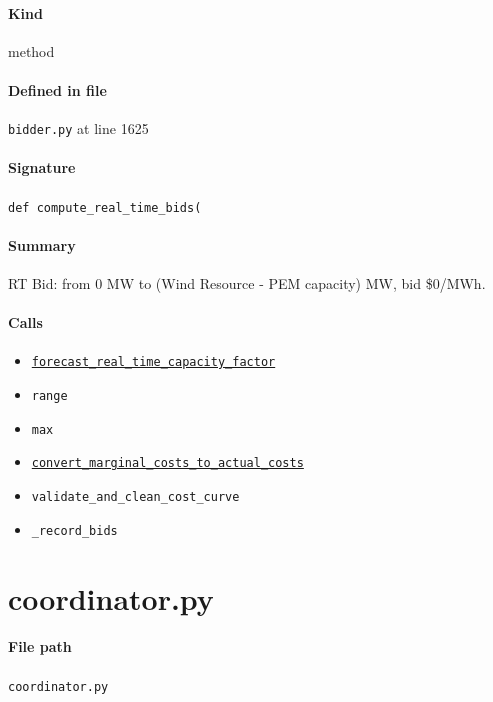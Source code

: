 \documentclass[11pt]{report}
\begin{document}
\paragraph{Kind} method
\paragraph{Defined in file} \texttt{bidder.py} at line 1625
\paragraph{Signature} \texttt{def compute\_real\_time\_bids(}
\paragraph{Summary} RT Bid: from 0 MW to (Wind Resource - PEM capacity) MW, bid \$0/MWh.
\paragraph{Calls}
\begin{itemize}[leftmargin=*]
  \item \hyperref[def:forecaster.py:PerfectForecaster.forecast_real_time_capacity_factor:L793]{\texttt{forecast\_real\_time\_capacity\_factor}}
  \item \texttt{range}
  \item \texttt{max}
  \item \hyperref[def:utils.py:convert_marginal_costs_to_actual_costs:L15]{\texttt{convert\_marginal\_costs\_to\_actual\_costs}}
  \item \texttt{validate\_and\_clean\_cost\_curve}
  \item \texttt{\_record\_bids}
\end{itemize}

\section{coordinator.py}
\label{file:coordinator.py}
\paragraph{File path} \texttt{coordinator.py}
\end{document}
